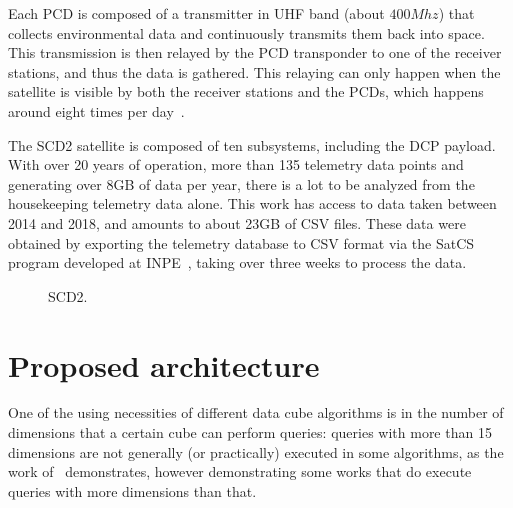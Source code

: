 Each PCD is composed of a transmitter in UHF band (about $400Mhz$) that collects environmental data and continuously transmits them back into space.
This transmission is then relayed by the PCD transponder to one of the receiver stations, and thus the data is gathered.
This relaying can only happen when the satellite is visible by both the receiver stations and the PCDs, which happens around eight times per day~\cite{miguezSCD2OperationHandbook1993}.

The SCD2 satellite is composed of ten subsystems, including the DCP payload.
With over 20 years of operation, more than 135 telemetry data points and generating over 8GB of data per year, there is a lot to be analyzed from the housekeeping telemetry data alone.
This work has access to data taken between 2014 and 2018, and amounts to about 23GB of CSV files.
These data were obtained by exporting the telemetry database to CSV format via the SatCS program developed at INPE~\cite{inpeFrameworkSistemaControle2015}, taking over three weeks to process the data.

\begin{figure}[H]
  \caption{SCD2.}\label{fig:scd2_mission}
  \vspace{6mm}
  \begin{center}
  \end{center}
  \vspace{2mm}
\end{figure}

\section{Proposed architecture}\label{ch:prop:static}

One of the using necessities of different data cube algorithms is in the number of dimensions that a certain cube can perform queries: queries with more than 15 dimensions are not generally (or practically) executed in some algorithms, as the work of~ demonstrates, however demonstrating some works that do execute queries with more dimensions than that.

